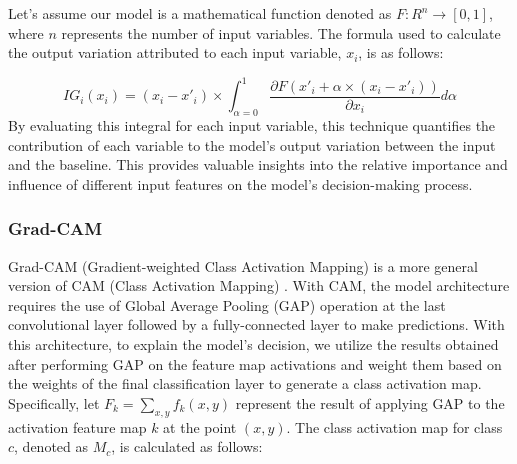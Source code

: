 Let's assume our model is a mathematical function denoted as $F: R^n \rightarrow [0, 1]$, where $n$ represents the number of input variables. The formula used to calculate the output variation attributed to each input variable, $x_i$, is as follows:

\begin{equation} \label{ig_formula}
IG_i(x_i) = (x_i - x'_i) \times \int_{\alpha = 0}^{1} \frac{\partial F(x'_i + \alpha \times (x_i - x'_i))}{\partial x_i}d\alpha 
\end{equation}
By evaluating this integral for each input variable, this technique quantifies the contribution of each variable to the model's output variation between the input and the baseline. This provides valuable insights into the relative importance and influence of different input features on the model's decision-making process.

\subsubsection{Grad-CAM}
\label{subsubsec:GC}

Grad-CAM (Gradient-weighted Class Activation Mapping) \cite{grad_cam} is a more general version of CAM (Class Activation Mapping) \cite{cam_zhou}. With CAM, the model architecture requires the use of Global Average Pooling (GAP) operation at the last convolutional layer followed by a fully-connected layer to make predictions. With this architecture, to explain the model's decision, we utilize the results obtained after performing GAP on the feature map activations and weight them based on the weights of the final classification layer to generate a class activation map. Specifically, let $F_k = \sum_{x, y} {f_k(x,y)}$ represent the result of applying GAP to the activation feature map $k$ at the point $(x, y)$. The class activation map for class $c$, denoted as $M_c$, is calculated as follows:

